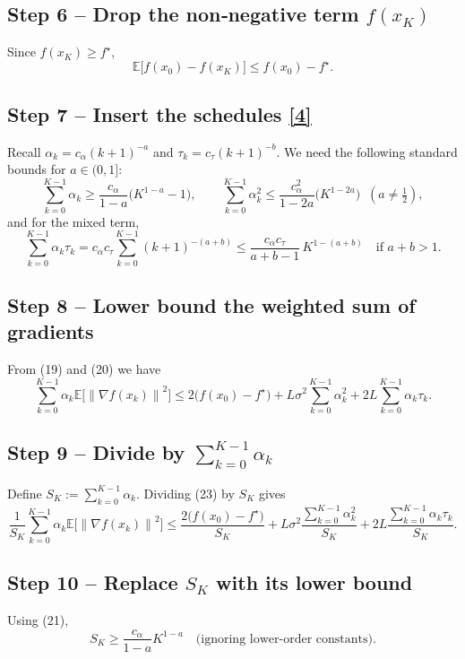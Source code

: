 \documentclass{article}
\newcommand{\EE}{\mathbb{E}}
\newcommand{\norm}[1]{\left\lVert #1\right\rVert}
\begin{document}
\subsection*{Step 6 – Drop the non‑negative term $f(x_{K})$}
Since $f(x_{K})\ge f^{\star}$,
\[
\EE\!\bigl[f(x_{0})-f(x_{K})\bigr]\le f(x_{0})-f^{\star}.
\tag{20}
\]

\subsection*{Step 7 – Insert the schedules \eqref{4}}
Recall $\alpha_{k}=c_{\alpha}(k+1)^{-a}$ and $\tau_{k}=c_{\tau}(k+1)^{-b}$.  
We need the following standard bounds for $a\in(0,1]$:
\[
\sum_{k=0}^{K-1}\alpha_{k}
\ge \frac{c_{\alpha}}{1-a}\bigl(K^{1-a}-1\bigr),
\qquad
\sum_{k=0}^{K-1}\alpha_{k}^{2}
\le \frac{c_{\alpha}^{2}}{1-2a}\bigl(K^{1-2a}\bigr)\;\;(a\neq\tfrac12),
\tag{21}
\]
and for the mixed term,
\[
\sum_{k=0}^{K-1}\alpha_{k}\tau_{k}
= c_{\alpha}c_{\tau}\sum_{k=0}^{K-1}(k+1)^{-(a+b)}
\le
\frac{c_{\alpha}c_{\tau}}{a+b-1}\,K^{1-(a+b)}\quad\text{if }a+b>1.
\tag{22}
\]

\subsection*{Step 8 – Lower bound the weighted sum of gradients}
From (19) and (20) we have
\[
\sum_{k=0}^{K-1}\alpha_{k}\EE\!\bigl[\norm{\nabla f(x_{k})}^{2}\bigr]
\le
2\bigl(f(x_{0})-f^{\star}\bigr)
+L\sigma^{2}\sum_{k=0}^{K-1}\alpha_{k}^{2}
+2L\sum_{k=0}^{K-1}\alpha_{k}\tau_{k}.
\tag{23}
\]

\subsection*{Step 9 – Divide by $\sum_{k=0}^{K-1}\alpha_{k}$}
Define $S_{K}:=\sum_{k=0}^{K-1}\alpha_{k}$. Dividing (23) by $S_{K}$ gives
\[
\frac{1}{S_{K}}\sum_{k=0}^{K-1}\alpha_{k}\EE\!\bigl[\norm{\nabla f(x_{k})}^{2}\bigr]
\le
\frac{2\bigl(f(x_{0})-f^{\star}\bigr)}{S_{K}}
+L\sigma^{2}\frac{\sum_{k=0}^{K-1}\alpha_{k}^{2}}{S_{K}}
+2L\frac{\sum_{k=0}^{K-1}\alpha_{k}\tau_{k}}{S_{K}}.
\tag{24}
\]

\subsection*{Step 10 – Replace $S_{K}$ with its lower bound}
Using (21),
\[
S_{K}\ge \frac{c_{\alpha}}{1-a}K^{1-a}\quad\text{(ignoring lower‑order constants)}.
\tag{25}
\]
\end{document}
